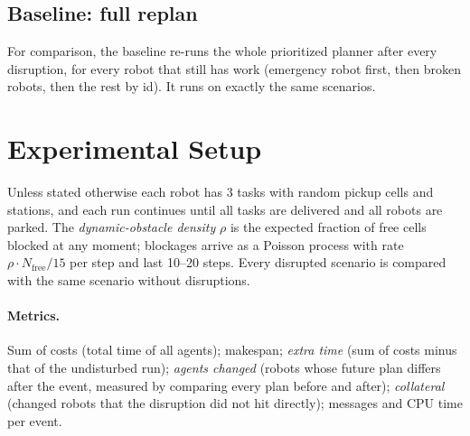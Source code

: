 \documentclass[11pt,a4paper]{article}
\begin{document}
\subsection{Baseline: full replan}
For comparison, the baseline re-runs the whole prioritized planner after every disruption, for every robot
that still has work (emergency robot first, then broken robots, then the rest by id). It runs on exactly
the same scenarios.

\section{Experimental Setup}

Unless stated otherwise each robot has 3 tasks with random pickup cells and stations, and each run
continues until all tasks are delivered and all robots are parked. The \emph{dynamic-obstacle density}
$\rho$ is the expected fraction of free cells blocked at any moment; blockages arrive as a Poisson process
with rate $\rho\cdot N_{\text{free}}/15$ per step and last 10--20 steps. Every disrupted scenario is
compared with the same scenario without disruptions.

\paragraph{Metrics.} Sum of costs (total time of all agents); makespan; \emph{extra time} (sum of costs
minus that of the undisturbed run); \emph{agents changed} (robots whose future plan differs after the
event, measured by comparing every plan before and after); \emph{collateral} (changed robots that the
disruption did not hit directly); messages and CPU time per event.
\end{document}
